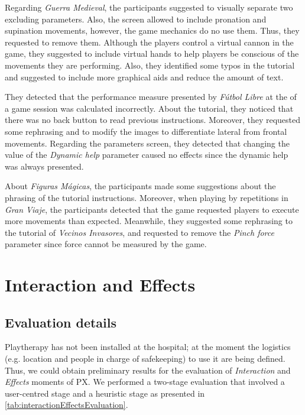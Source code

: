 Regarding \textit{Guerra Medieval}, the participants suggested to visually separate two excluding parameters. Also, the screen allowed to include pronation and supination movements, however, the game mechanics do no use them. Thus, they requested to remove them. Although the players control a virtual cannon in the game, they suggested to include virtual hands to help players be conscious of the movements they are performing. Also, they identified some typos in the tutorial and suggested to include more graphical aids and reduce the amount of text.

They detected that the performance measure presented by \textit{F\'utbol Libre} at the of a game session was calculated incorrectly. About the tutorial, they noticed that there was no back button to read previous instructions. Moreover, they requested some rephrasing and to modify the images to differentiate lateral from frontal movements. Regarding the parameters screen, they detected that changing the value of the \textit{Dynamic help} parameter caused no effects since the dynamic help was always presented.

About \textit{Figuras Mágicas}, the participants made some suggestions about the phrasing of the tutorial instructions. Moreover, when playing by repetitions in \textit{Gran Viaje}, the participants detected that the game requested players to execute more movements than expected. Meanwhile, they suggested some rephrasing to the tutorial of \textit{Vecinos Invasores}, and requested to remove the \textit{Pinch force} parameter since force cannot be measured by the game.

\section{Interaction and Effects}
\label{sec:interaction_eval}
\subsection{Evaluation details}
Playtherapy has not been installed at the hospital; at the moment the logistics (e.g. location and people in charge of safekeeping) to use it are being defined. Thus, we could obtain preliminary results for the evaluation of \emph{Interaction} and \emph{Effects} moments of \ac{PX}. We performed a two-stage evaluation that involved a user-centred stage and a heuristic stage as presented in \autoref{tab:interactionEffectsEvaluation}.

